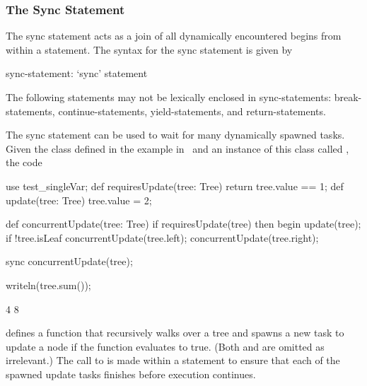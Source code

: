 \subsubsection{The Sync Statement}
\label{Sync_Statement}

The sync statement acts as a join of all dynamically encountered
begins from within a statement.  The syntax for the sync statement is
given by
\begin{syntax}
sync-statement:
  `sync' statement
\end{syntax}
The following statements may not be lexically enclosed in
sync-statements: break-statements, continue-statements,
yield-statements, and return-statements.

\begin{example}
The sync statement can be used to wait for many dynamically spawned
tasks.  Given the  class defined in the example
in~ and an instance of this class
called , the code
\begin{chapelpre}
use test\_singleVar;
def requiresUpdate(tree: Tree) {
  return tree.value == 1;
}
def update(tree: Tree) {
  tree.value = 2;
}
\end{chapelpre}
\begin{chapel}
def concurrentUpdate(tree: Tree) {
  if requiresUpdate(tree) then
    begin update(tree);
  if !tree.isLeaf {
    concurrentUpdate(tree.left);
    concurrentUpdate(tree.right);
  }
}

sync concurrentUpdate(tree);
\end{chapel}
\begin{chapelpost}
writeln(tree.sum());
\end{chapelpost}
\begin{chapeloutput}
4
8
\end{chapeloutput}
defines a function  that recursively walks over
a tree and spawns a new task to update a node if the
function  evaluates to true.
(Both  and  are omitted as
irrelevant.)  The call to  is made within
a  statement to ensure that each of the spawned update
tasks finishes before execution continues.
\end{example}

